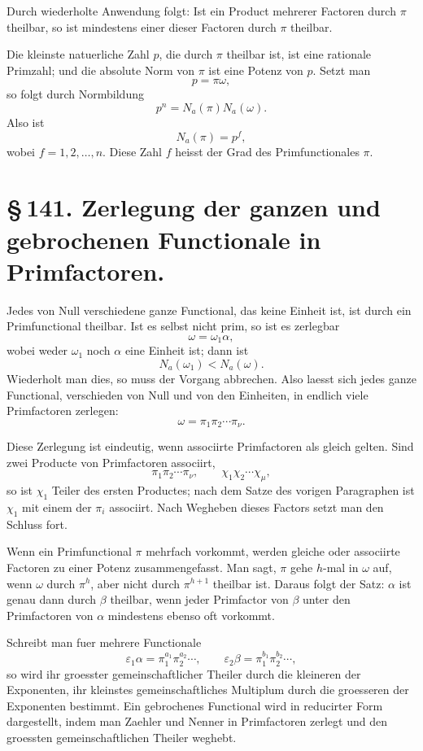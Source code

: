 \documentclass[11pt]{article}
\begin{document}
Durch wiederholte Anwendung folgt: Ist ein Product mehrerer Factoren
durch \(\pi\) theilbar, so ist mindestens einer dieser Factoren durch
\(\pi\) theilbar.

Die kleinste natuerliche Zahl \(p\), die durch \(\pi\) theilbar ist,
ist eine rationale Primzahl; und die absolute Norm von \(\pi\) ist
eine Potenz von \(p\). Setzt man
\[
p=\pi\omega,
\tag{1}
\]
so folgt durch Normbildung
\[
p^n=N_a(\pi)N_a(\omega).
\tag{2}
\]
Also ist
\[
N_a(\pi)=p^f,
\tag{3}
\]
wobei \(f=1,2,\ldots,n\). Diese Zahl \(f\) heisst der Grad des
Primfunctionales \(\pi\).

\section*{\S\,141. Zerlegung der ganzen und gebrochenen Functionale in Primfactoren.}

Jedes von Null verschiedene ganze Functional, das keine Einheit ist,
ist durch ein Primfunctional theilbar. Ist es selbst nicht prim, so
ist es zerlegbar
\[
\omega=\omega_1\alpha,
\tag{1}
\]
wobei weder \(\omega_1\) noch \(\alpha\) eine Einheit ist; dann ist
\[
N_a(\omega_1)<N_a(\omega).
\tag{2}
\]
Wiederholt man dies, so muss der Vorgang abbrechen. Also laesst sich
jedes ganze Functional, verschieden von Null und von den Einheiten,
in endlich viele Primfactoren zerlegen:
\[
\omega=\pi_1\pi_2\cdots\pi_\nu.
\tag{5}
\]

Diese Zerlegung ist eindeutig, wenn associirte Primfactoren als
gleich gelten. Sind zwei Producte von Primfactoren associirt,
\[
\pi_1\pi_2\cdots\pi_\nu,\qquad
\chi_1\chi_2\cdots\chi_\mu,
\tag{6}
\]
so ist \(\chi_1\) Teiler des ersten Productes; nach dem Satze des
vorigen Paragraphen ist \(\chi_1\) mit einem der \(\pi_i\) associirt.
Nach Wegheben dieses Factors setzt man den Schluss fort.

Wenn ein Primfunctional \(\pi\) mehrfach vorkommt, werden gleiche
oder associirte Factoren zu einer Potenz zusammengefasst. Man sagt,
\(\pi\) gehe \(h\)-mal in \(\omega\) auf, wenn \(\omega\) durch
\(\pi^h\), aber nicht durch \(\pi^{h+1}\) theilbar ist. Daraus folgt
der Satz: \(\alpha\) ist genau dann durch \(\beta\) theilbar, wenn
jeder Primfactor von \(\beta\) unter den Primfactoren von \(\alpha\)
mindestens ebenso oft vorkommt.

Schreibt man fuer mehrere Functionale
\begin{equation}
\varepsilon_1\alpha=\pi_1^{a_1}\pi_2^{a_2}\cdots,\qquad
\varepsilon_2\beta=\pi_1^{b_1}\pi_2^{b_2}\cdots,
\tag{7}
\end{equation}
so wird ihr groesster gemeinschaftlicher Theiler durch die kleineren
der Exponenten, ihr kleinstes gemeinschaftliches Multiplum durch die
groesseren der Exponenten bestimmt. Ein gebrochenes Functional wird
in reducirter Form dargestellt, indem man Zaehler und Nenner in
Primfactoren zerlegt und den groessten gemeinschaftlichen Theiler
weghebt.
\end{document}
